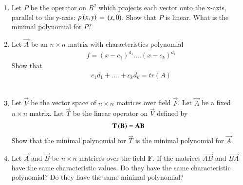 \begin{enumerate}[label=\thesubsection.\arabic*.,ref=\thesubsection.\theenumi]
%
\item Let $P$ be the operator on $R^2$ which projects each vector onto the x-axis, parallel to the y-axis: $p\left(x,y\right)$ = $\left(x,0\right)$. Show that $P$ is linear. What is the minimal polynomial for $P$? 
%
\\
\solution

\twocolumn
\item %
Let $\vec{A}$ be an $n\times n$ matrix with characteristics polynomial\\
\begin{align}
& f = (x-c_1)^{d_1}....(x-c_k)^{d_k} 
\end{align}
Show that
\begin{align}
& c_1d_1+....+c_kd_k = tr(A)
\end{align}
%
%
\\
\solution

\twocolumn
\item Let $\vec{V}$ be the vector space of $n\times n$ matrices over field $\vec{F}$. Let $\vec{A}$ be a fixed $n\times n$ matrix. Let $\vec{T}$ be the linear operator on $\vec{V}$ defined by
\begin{align}
    \mathbf{T\left(B\right)}=\mathbf{AB}
\end{align}
Show that the minimal polynomial for $\vec{T}$ is the minimal polynomial for $\vec{A}$.
%
\\
\solution

\item 	Let $\vec{A}$ and $\vec{B}$ be $n\times n$ matrices over the field $\mathbf{F}$. If the matrices $\vec{AB}$ and $\vec{BA}$ have the same characteristic values. Do they have the same characteristic polynomial? Do they have the same minimal polynomial? 
%
\\
\solution

\end{enumerate}
